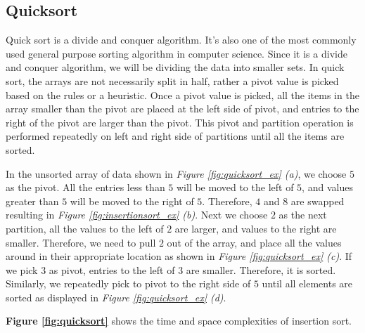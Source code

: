 \subsection{Quicksort}

Quick sort is a divide and conquer algorithm. It’s also one of the most commonly used general purpose sorting algorithm in computer science. Since it is a divide and conquer algorithm, we will be dividing the data into smaller sets. In quick sort, the arrays are not necessarily split in half, rather a pivot value is picked based on the rules or a heuristic. Once a pivot value is picked, all the items in the array smaller than the pivot are placed at the left side of pivot, and entries to the right of the pivot are larger than the pivot. This pivot and partition operation is performed repeatedly on left and right side of partitions until all the items are sorted. 

In the unsorted array of data shown in \textit{Figure \ref{fig:quicksort_ex} (a)}, we choose $5$ as the pivot. All the entries less than $5$ will be moved to the left of $5$, and values greater than $5$ will be moved to the right of $5$. Therefore, $4$ and $8$ are swapped resulting in \textit{Figure \ref{fig:insertionsort_ex} (b)}. Next we choose $2$ as the next partition, all the values to the left of $2$ are larger, and values to the right are smaller. Therefore, we need to pull $2$ out of the array, and place all the values around in their appropriate location as shown in \textit{Figure \ref{fig:quicksort_ex} (c)}. If we pick $3$ as pivot, entries to the left of $3$ are smaller. Therefore, it is sorted. Similarly, we repeatedly pick to pivot to the right side of $5$ until all elements are sorted as displayed in \textit{Figure \ref{fig:quicksort_ex} (d)}.

\textbf{Figure \ref{fig:quicksort}} shows the time and space complexities of insertion sort.

